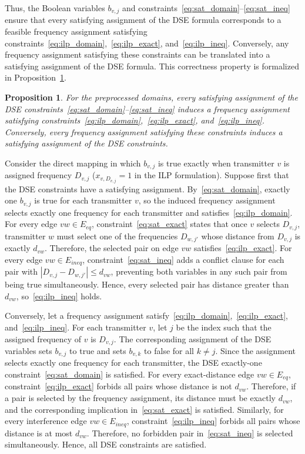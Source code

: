 \documentclass[letterpaper,journal]{IEEEtran}
\newtheorem{proposition}{Proposition}
\begin{document}
Thus, the Boolean variables $b_{v,j}$ and constraints~\eqref{eq:sat_domain}--\eqref{eq:sat_ineq} ensure that every satisfying assignment of the DSE formula corresponds to a feasible frequency assignment satisfying constraints~\eqref{eq:ilp_domain},~\eqref{eq:ilp_exact}, and~\eqref{eq:ilp_ineq}. Conversely, any frequency assignment satisfying these constraints can be translated into a satisfying assignment of the DSE formula. This correctness property is formalized in Proposition~\ref{prop:dse_correctness}.

\begin{proposition}
\label{prop:dse_correctness}
For the preprocessed domains, every satisfying assignment of the DSE constraints~\eqref{eq:sat_domain}--\eqref{eq:sat_ineq} induces a frequency assignment satisfying constraints~\eqref{eq:ilp_domain},~\eqref{eq:ilp_exact}, and~\eqref{eq:ilp_ineq}. Conversely, every frequency assignment satisfying these constraints induces a satisfying assignment of the DSE constraints.
\end{proposition}

\begin{IEEEproof}
Consider the direct mapping in which $b_{v,j}$ is true exactly when transmitter $v$ is assigned frequency $D_{v,j}$ ($x_{v,D_{v,j}}=1$ in the ILP formulation).
Suppose first that the DSE constraints have a satisfying assignment. By~\eqref{eq:sat_domain}, exactly one $b_{v,j}$ is true for each transmitter $v$, so the induced frequency assignment selects exactly one frequency for each transmitter and satisfies~\eqref{eq:ilp_domain}. For every edge $vw\in E_{eq}$, constraint~\eqref{eq:sat_exact} states that once $v$ selects $D_{v,j}$, transmitter $w$ must select one of the frequencies $D_{w,j'}$ whose distance from $D_{v,j}$ is exactly $d_{vw}$. Therefore, the selected pair on edge $vw$ satisfies~\eqref{eq:ilp_exact}. For every edge $vw\in E_{ineq}$, constraint~\eqref{eq:sat_ineq} adds a conflict clause for each pair with $|D_{v,j}-D_{w,j'}|\le d_{vw}$, preventing both variables in any such pair from being true simultaneously. Hence, every selected pair has distance greater than $d_{vw}$, so~\eqref{eq:ilp_ineq} holds.

Conversely, let a frequency assignment satisfy~\eqref{eq:ilp_domain},~\eqref{eq:ilp_exact}, and~\eqref{eq:ilp_ineq}. 
For each transmitter $v$, let $j$ be the index such that the assigned frequency of $v$ is $D_{v,j}$.
The corresponding assignment of the DSE variables sets $b_{v,j}$ to true and sets $b_{v,k}$ to false for all $k\neq j$.
Since the assignment selects exactly one frequency for each transmitter, the DSE exactly-one constraint~\eqref{eq:sat_domain} is satisfied.
For every exact-distance edge $vw\in E_{eq}$, constraint~\eqref{eq:ilp_exact} forbids all pairs whose distance is not $d_{vw}$. Therefore, if a pair is selected by the frequency assignment, its distance must be exactly $d_{vw}$, and the corresponding implication in~\eqref{eq:sat_exact} is satisfied.
Similarly, for every interference edge $vw\in E_{ineq}$, constraint~\eqref{eq:ilp_ineq} forbids all pairs whose distance is at most $d_{vw}$. Therefore, no forbidden pair in~\eqref{eq:sat_ineq} is selected simultaneously. Hence, all DSE constraints are satisfied.
\end{IEEEproof}
\end{document}
